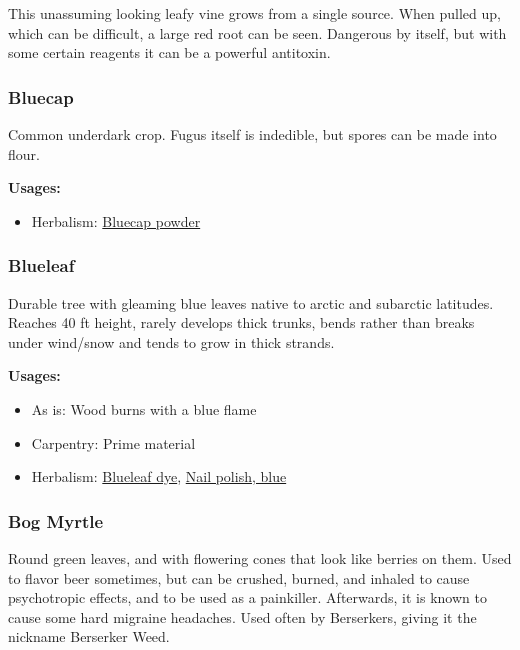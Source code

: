 This unassuming looking leafy vine grows from a single source. When pulled up, which can be difficult, a large red root can be seen. Dangerous by itself, but with some certain reagents it can be a powerful antitoxin.

\subsubsection{Bluecap}
\label{Bluecap}

Common underdark crop. Fugus itself is indedible, but spores can be made into flour.

\vspace{5mm}

\textbf{Usages:}

\begin{itemize}[noitemsep]
\item[] Herbalism: \hyperref[Bluecap powder]{Bluecap powder}
\end{itemize}

\subsubsection{Blueleaf}
\label{Blueleaf}

Durable tree with gleaming blue leaves native to arctic and subarctic latitudes. Reaches 40 ft height, rarely develops thick trunks, bends rather than breaks under wind/snow and tends to grow in thick strands.

\vspace{5mm}

\textbf{Usages:}

\begin{itemize}[noitemsep]
\item[] As is: Wood burns with a blue flame
\item[] Carpentry: Prime material
\item[] Herbalism: \hyperref[Blueleaf dye]{Blueleaf dye}, \hyperref[nail_polish_blue]{Nail polish, blue}
\end{itemize}

\subsubsection{Bog Myrtle}
\label{bog_myrtle}

Round green leaves, and with flowering cones that look like berries on them. Used to flavor beer sometimes, but can be crushed, burned, and inhaled to cause psychotropic effects, and to be used as a painkiller. Afterwards, it is known to cause some hard migraine headaches. Used often by Berserkers, giving it the nickname Berserker Weed.

